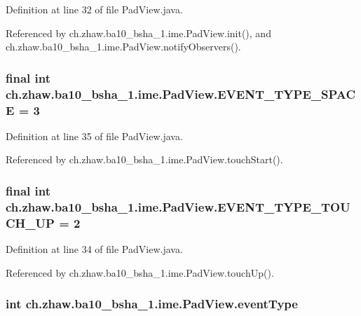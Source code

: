 Definition at line 32 of file PadView.java.

Referenced by ch.zhaw.ba10\_\-bsha\_\-1.ime.PadView.init(), and ch.zhaw.ba10\_\-bsha\_\-1.ime.PadView.notifyObservers().\hypertarget{classch_1_1zhaw_1_1ba10__bsha__1_1_1ime_1_1PadView_af16e51780a0ada3ad00a022717084b41}{
\subsubsection[{EVENT\_\-TYPE\_\-SPACE}]{\setlength{\rightskip}{0pt plus 5cm}final int {\bf ch.zhaw.ba10\_\-bsha\_\-1.ime.PadView.EVENT\_\-TYPE\_\-SPACE} = 3}}
\label{classch_1_1zhaw_1_1ba10__bsha__1_1_1ime_1_1PadView_af16e51780a0ada3ad00a022717084b41}


Definition at line 35 of file PadView.java.

Referenced by ch.zhaw.ba10\_\-bsha\_\-1.ime.PadView.touchStart().\hypertarget{classch_1_1zhaw_1_1ba10__bsha__1_1_1ime_1_1PadView_a09fad18879227b2619c33c071a66523d}{
\subsubsection[{EVENT\_\-TYPE\_\-TOUCH\_\-UP}]{\setlength{\rightskip}{0pt plus 5cm}final int {\bf ch.zhaw.ba10\_\-bsha\_\-1.ime.PadView.EVENT\_\-TYPE\_\-TOUCH\_\-UP} = 2}}
\label{classch_1_1zhaw_1_1ba10__bsha__1_1_1ime_1_1PadView_a09fad18879227b2619c33c071a66523d}


Definition at line 34 of file PadView.java.

Referenced by ch.zhaw.ba10\_\-bsha\_\-1.ime.PadView.touchUp().\hypertarget{classch_1_1zhaw_1_1ba10__bsha__1_1_1ime_1_1PadView_a4884ead1ce1948227083986cb75b6a0a}{
\subsubsection[{eventType}]{\setlength{\rightskip}{0pt plus 5cm}int {\bf ch.zhaw.ba10\_\-bsha\_\-1.ime.PadView.eventType}}}
\label{classch_1_1zhaw_1_1ba10__bsha__1_1_1ime_1_1PadView_a4884ead1ce1948227083986cb75b6a0a}


